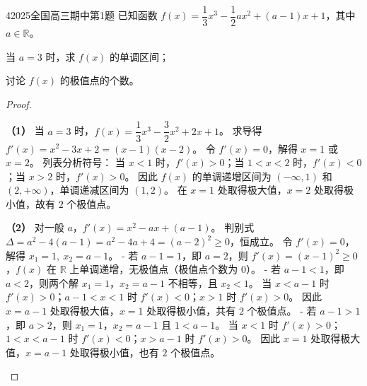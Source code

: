 \documentclass[
showanswers,        %
answercolor=red,    %
paper=a4,           %
sectioncolor=cyan,  %
subsectioncolor=cyan,
exercisecolor=orange, %
examplecolor=cyan,    %
bianshicolor=purple   %
]{biscuits}
\begin{document}
	\begin{example}{4}{2025}{全国}{高三}{期中}{第1题}
		已知函数 $f(x)=\dfrac{1}{3}x^3-\dfrac{1}{2}ax^2+(a-1)x+1$，其中 $a\in\mathbb{R}$。
		\begin{quan}
			\item 当 $a=3$ 时，求 $f(x)$ 的单调区间；
			\item 讨论 $f(x)$ 的极值点的个数。
		\end{quan}
		\begin{choices}
		\end{choices}
		\begin{proof}
			\begin{answer}
				\noindent\textbf{（1）} 当 $a=3$ 时，$f(x)=\dfrac{1}{3}x^3-\dfrac{3}{2}x^2+2x+1$。  
				求导得 $f'(x)=x^2-3x+2=(x-1)(x-2)$。  
				令 $f'(x)=0$，解得 $x=1$ 或 $x=2$。  
				列表分析符号：  
				当 $x<1$ 时，$f'(x)>0$；当 $1<x<2$ 时，$f'(x)<0$；当 $x>2$ 时，$f'(x)>0$。  
				因此 $f(x)$ 的单调递增区间为 $(-\infty,1)$ 和 $(2,+\infty)$，单调递减区间为 $(1,2)$。  
				在 $x=1$ 处取得极大值，$x=2$ 处取得极小值，故有 $2$ 个极值点。  
				
				\noindent\textbf{（2）} 对一般 $a$，$f'(x)=x^2-ax+(a-1)$。  
				判别式 $\Delta = a^2-4(a-1)=a^2-4a+4=(a-2)^2 \ge 0$，恒成立。  
				令 $f'(x)=0$，解得 $x_1=1,\ x_2=a-1$。  
				- 若 $a-1 = 1$，即 $a=2$，则 $f'(x)=(x-1)^2\ge 0$，$f(x)$ 在 $\mathbb{R}$ 上单调递增，无极值点（极值点个数为 $0$）。  
				- 若 $a-1 < 1$，即 $a<2$，则两个解 $x_1=1$，$x_2=a-1$ 不相等，且 $x_2<1$。  
				当 $x<a-1$ 时 $f'(x)>0$；$a-1<x<1$ 时 $f'(x)<0$；$x>1$ 时 $f'(x)>0$。  
				因此 $x=a-1$ 处取得极大值，$x=1$ 处取得极小值，共有 $2$ 个极值点。  
				- 若 $a-1 > 1$，即 $a>2$，则 $x_1=1$，$x_2=a-1$ 且 $1<a-1$。  
				当 $x<1$ 时 $f'(x)>0$；$1<x<a-1$ 时 $f'(x)<0$；$x>a-1$ 时 $f'(x)>0$。  
				因此 $x=1$ 处取得极大值，$x=a-1$ 处取得极小值，也有 $2$ 个极值点。  
				

\end{answer}
\end{proof}
\end{example}
\end{document}
